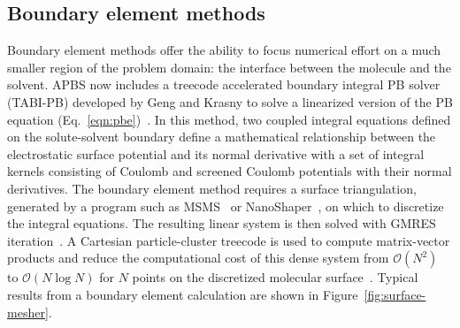\documentclass[12pt,titlepage]{article}
\begin{document}
\subsection{Boundary element methods} \label{sec:bem}
Boundary element methods offer the ability to focus numerical effort on a much smaller region of the problem domain:  the interface between the molecule and the solvent.
APBS now includes a treecode accelerated boundary integral PB solver (TABI-PB) developed by Geng and Krasny to solve a linearized version of the PB equation (Eq.~\ref{eqn:pbe})~\cite{Geng2013}.
In this method, two coupled integral equations defined on the solute-solvent boundary define a mathematical relationship between the electrostatic surface potential and its normal derivative with a set of integral kernels consisting of Coulomb and screened Coulomb potentials with their normal derivatives.
The boundary element method requires a surface triangulation, generated by a program such as MSMS~\cite{Sanner1995} or NanoShaper~\cite{Decherchi2013}, on which to discretize the integral equations.
The resulting linear system is then solved with GMRES iteration~\cite{Saad1986}.
A Cartesian particle-cluster treecode is used to compute matrix-vector products and reduce the computational cost of this dense system from $\mathcal{O}(N^2)$ to $\mathcal{O}(N\log N)$ for $N$ points on the discretized molecular surface~\cite{Li2009, Juffer1991}.
Typical results from a boundary element calculation are shown in Figure~\ref{fig:surface-mesher}.
\end{document}
